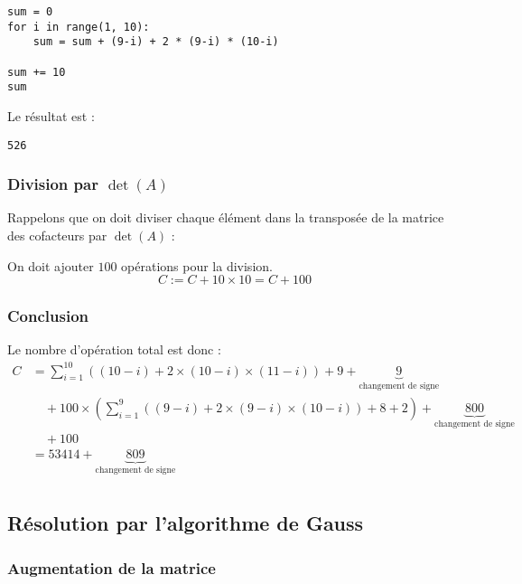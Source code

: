 \documentclass{article}
\begin{document}
\begin{lstlisting}
sum = 0
for i in range(1, 10):
    sum = sum + (9-i) + 2 * (9-i) * (10-i)

sum += 10
sum
\end{lstlisting}

Le résultat est :
\begin{lstlisting}
526
\end{lstlisting}

\subsubsection{Division par $\det(A)$}

Rappelons que on doit diviser chaque élément dans la transposée de la matrice des cofacteurs par $\det(A)$ :

\begin{tcolorbox}
    On doit ajouter $100$ opérations pour la division.
\[
C := C + 10 \times 10 = C + 100
\]
\end{tcolorbox}

\subsubsection{Conclusion}

\begin{tcolorbox}[title={Conclusion}, fonttitle = \bfseries \sffamily]
    Le nombre d'opération total est donc :
    \begin{align*}
        C &=   
        \sum_{i=1}^{10} ((10-i)+ 2 \times (10-i)\times (11-i)) + 9 + \underbrace{9}_{\text{changement de signe}} \\ &\quad+ 100 \times  \left(\sum_{i=1}^{9} ((9-i) + 2 \times  (9 - i) \times  (10 -i)) + 8+2\right)+ \underbrace{800}_{\text{changement de signe}}\\
        &\quad+ 100 \\
          &= 53414 + \underbrace{809}_{\text{changement de signe}} \\
    \end{align*}
\end{tcolorbox}

\newpage

\subsection{Résolution par l'algorithme de Gauss}

\subsubsection{Augmentation de la matrice}
\end{document}
